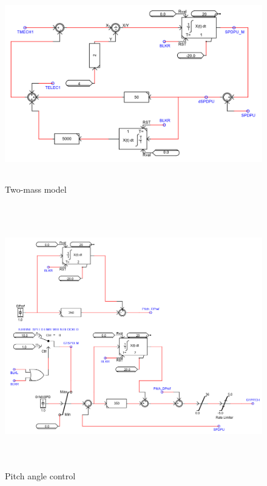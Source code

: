 \begin{figure}[H]
\centering
    \includegraphics[height = 8.5cm,width = 12.5cm]{Diagrams/Appendix_A/Two_mass_model.PNG}
    \caption{Two-mass model}
    \label{fig:Two-mass model}
\end{figure}

\begin{figure}[H]
\centering
    \includegraphics[height = 11.5cm,width = 14.5cm]{Diagrams/Appendix_A/Pitch_controller.PNG}
    \caption{Pitch angle control}
    \label{fig:Pitch_controller}
\end{figure}

